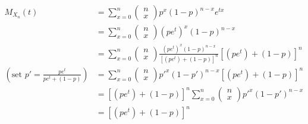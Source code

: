 \documentclass[../Transformation.tex]{subfiles}
\begin{document}
\begin{align*}
M_{X_n}(t) &= \sum_{x=0}^n\left(\begin{array}{c}
n\\
x
\end{array}\right)p^{x}(1-p)^{n-x}e^{tx}\\
&=\sum_{x=0}^n\left(\begin{array}{c}
n\\
x
\end{array}\right)(pe^t)^x(1-p)^{n-x}\\
&=\sum_{x=0}^n\left(\begin{array}{c}
n\\
x
\end{array}\right)\frac{(pe^t)^x(1-p)^{n-x}}{[(pe^t)+(1-p)]^n}[(pe^t)+(1-p)]^n\\
(\mbox{set }p'=\frac{pe^t}{pe^t+(1-p)})&=\sum_{x=0}^n\left(\begin{array}{c}
n\\
x
\end{array}\right)p'^x(1-p')^{n-x}[(pe^t)+(1-p)]^n\\
&=[(pe^t)+(1-p)]^n\sum_{x=0}^n\left(\begin{array}{c}
n\\
x
\end{array}\right)p'^x(1-p')^{n-x}\\
&=[(pe^t)+(1-p)]^n
\end{align*}
\end{document}
